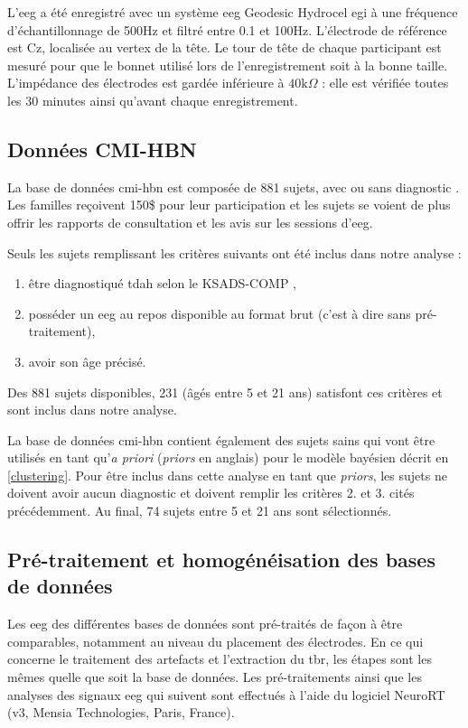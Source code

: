 L'\gls{eeg} a été enregistré avec un système \gls{eeg} Geodesic Hydrocel \gls{egi} à une fréquence d'échantillonnage de 500Hz et filtré entre 0.1 et 100Hz. 
L'électrode de référence est Cz, localisée au vertex de la tête. Le tour de tête de chaque participant est mesuré pour que le bonnet utilisé lors de l'enregistrement 
soit à la bonne taille. L'impédance des électrodes est gardée inférieure à $40\text{k}\Omega$ : elle est vérifiée toutes les 30 minutes ainsi qu'avant chaque enregistrement.

\subsection{Données CMI-HBN}
La base de données \gls{cmi-hbn} est composée de 881 sujets, avec ou sans diagnostic \citep{Alexander2017, Alexander2017b}. Les familles reçoivent 150\$ pour leur participation 
et les sujets se voient de plus offrir les rapports de consultation et les avis sur les sessions d'\gls{eeg}.

Seuls les sujets remplissant les critères suivants ont été inclus dans notre analyse :
\begin{enumerate}
\item être diagnostiqué \gls{tdah} selon le KSADS-COMP \citep{Kaufman1997},
\item posséder un \gls{eeg} au repos disponible au format brut (c'est à dire sans pré-traitement),
\item avoir son âge précisé.
\end{enumerate}

Des 881 sujets disponibles, 231 (âgés entre 5 et 21 ans) satisfont ces critères et sont inclus dans notre analyse.

La base de données \gls{cmi-hbn} contient également des sujets sains qui vont être utilisés en tant qu'\textit{a priori} (\textit{priors} en anglais) pour le
modèle bayésien décrit en \ref{clustering}. Pour être inclus dans cette analyse en tant que \textit{priors}, les sujets ne doivent avoir aucun diagnostic 
et doivent remplir les critères 2. et 3. cités précédemment. Au final, 74 sujets entre 5 et 21 ans sont sélectionnés. 

\subsection{Pré-traitement et homogénéisation des bases de données} \label{pré-traitement TBR}
Les \gls{eeg} des différentes bases de données sont pré-traités de façon à être comparables, notamment au niveau du placement des électrodes.
En ce qui concerne le traitement des artefacts et l'extraction du \gls{tbr}, les étapes sont les mêmes quelle que soit la base de données. 
Les pré-traitements ainsi que les analyses des signaux \gls{eeg} qui suivent sont effectués à l'aide du logiciel NeuroRT (v3, Mensia Technologies, 
Paris, France).

